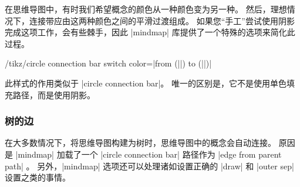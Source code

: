 
在思维导图中，有时我们希望概念的颜色从一种颜色变为另一种。 然后，理想情况下，连接带应由这两种颜色之间的平滑过渡组成。 如果您``手工''尝试使用阴影完成这项工作，会有些棘手，因此 |mindmap| 库提供了一个特殊的选项来简化此过程。

\begin{key}{/tikz/circle connection bar switch color=|from (||) to (||)|} 

    此样式的作用类似于 |circle connection bar|。 唯一的区别是，它不是使用单色填充路径，而是使用阴影。
\begin{codeexample}[preamble={\usetikzlibrary{mindmap}}]
\end{codeexample}
\end{key}


\subsubsection{树的边}


在大多数情况下，将思维导图构建为树时，思维导图中的概念会自动连接。 原因是 |mindmap| 加载了一个 |circle connection bar| 路径作为 |edge from parent path| 。 另外，|mindmap| 选项还可以处理诸如设置正确的 |draw| 和 |outer sep| 设置之类的事情。

